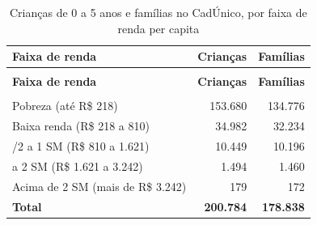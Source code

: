 \begin{apendicesenv}
{\small\setlength{\tabcolsep}{5pt}
\begin{longtable}{@{}>{\raggedright\arraybackslash}p{3.6cm}rr@{}}
\caption{Crianças de 0 a 5 anos e famílias no CadÚnico, por faixa de renda per capita}\label{tab:cadunico-por-faixa-renda-2026}\\
\toprule \textbf{Faixa de renda} & \textbf{Crianças} & \textbf{Famílias} \\ \midrule \endfirsthead
\multicolumn{3}{@{}l}{\footnotesize\itshape (continuação)}\\ \toprule \textbf{Faixa de renda} & \textbf{Crianças} & \textbf{Famílias} \\ \midrule \endhead
\midrule \multicolumn{3}{r@{}}{\footnotesize\itshape (continua)}\\ \endfoot
\bottomrule \endlastfoot
Pobreza (até R\$ 218) & 153.680 & 134.776 \\
Baixa renda (R\$ 218 a 810) & 34.982 & 32.234 \\
1/2 a 1 SM (R\$ 810 a 1.621) & 10.449 & 10.196 \\
1 a 2 SM (R\$ 1.621 a 3.242) & 1.494 & 1.460 \\
Acima de 2 SM (mais de R\$ 3.242) & 179 & 172 \\
\textbf{Total} & \textbf{200.784} & \textbf{178.838} \\
\end{longtable}}
\vspace{-6pt}



\end{apendicesenv}
